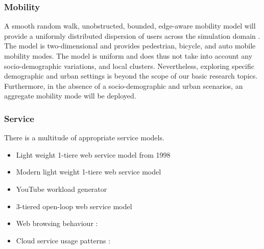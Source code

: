 \subsubsection{Mobility}
A smooth random walk, unobstructed, bounded, edge-aware mobility model will provide a uniformly distributed dispersion of users across the simulation domain \cite{Bettstetter:2001:SBS:381591.381600}. The model is two-dimensional and provides pedestrian, bicycle, and auto mobile mobility modes. The model is uniform and does thus not take into account any socio-demographic variations, and local clusters. Nevertheless, exploring specific demographic and urban settings is beyond the scope of our basic research topics. Furthermore, in the absence of a socio-demographic and urban scenarios, an aggregate mobility mode will be deployed.

\subsubsection{Service}
There is a multitude of appropriate service models. 

\begin{itemize}
\item Light weight 1-tiere web service model from 1998 \cite{barford1998generating}
\item Modern light weight 1-tiere web service model \cite{lee2007new}
\item YouTube workload generator \cite{Gill:2007:YTC:1298306.1298310}
\item 3-tiered open-loop web service model \cite{1521145}
\item Web browsing behaviour : \cite{liu2010understanding}
\item Cloud service usage patterns : \cite{zhao2009cloud}
\end{itemize}